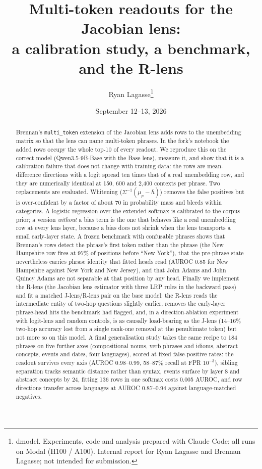 \documentclass[11pt]{article}
\title{Multi-token readouts for the Jacobian lens:\\ a calibration study, a benchmark, and the R-lens}
\author{Ryan Lagasse\thanks{dmodel. Experiments, code and analysis prepared with Claude Code; all runs on Modal (H100 / A100). Internal report for Ryan Lagasse and Brennan Lagasse; not intended for submission.}}
\date{September 12--13, 2026}
\renewcommand{\hbar}{\bar{h}}
\begin{document}
\maketitle

\begin{abstract}
Brennan's \texttt{multi\_token} extension of the Jacobian lens adds rows to the unembedding matrix so that the lens can name multi-token phrases. In the fork's notebook the added rows occupy the whole top-10 of every readout. We reproduce this on the correct model (Qwen3.5-9B-Base with the Base lens), measure it, and show that it is a calibration failure that does not change with training data: the rows are mean-difference directions with a logit spread ten times that of a real unembedding row, and they are numerically identical at 150, 600 and 2{,}400 contexts per phrase. Two replacements are evaluated. Whitening ($\Sigma^{-1}(\mu_p-\hbar)$) removes the false positives but is over-confident by a factor of about 70 in probability mass and bleeds within categories. A logistic regression over the extended softmax is calibrated to the corpus prior; a version \emph{without} a bias term is the one that behaves like a real unembedding row at every lens layer, because a bias does not shrink when the lens transports a small early-layer state. A frozen benchmark with confusable phrases shows that Brennan's rows detect the phrase's first token rather than the phrase (the New Hampshire row fires at 97\% of positions before ``New York''), that the pre-phrase state nevertheless carries phrase identity that fitted heads read (AUROC 0.85 for New Hampshire against New York and New Jersey), and that John Adams and John Quincy Adams are not separable at that position by any head. Finally we implement the R-lens (the Jacobian lens estimator with three LRP rules in the backward pass) and fit a matched J-lens/R-lens pair on the base model: the R-lens reads the intermediate entity of two-hop questions slightly earlier, removes the early-layer phrase-head hits the benchmark had flagged, and, in a direction-ablation experiment with logit-lens and random controls, is as causally load-bearing as the J-lens (14--16\% two-hop accuracy lost from a single rank-one removal at the penultimate token) but not more so on this model. A final generalisation study takes the same recipe to 184 phrases on five further axes (compositional nouns, verb phrases and idioms, abstract concepts, events and dates, four languages), scored at fixed false-positive rates: the readout survives every axis (AUROC 0.98--0.99, 58--87\% recall at FPR $10^{-3}$), sibling separation tracks semantic distance rather than syntax, events surface by layer 8 and abstract concepts by 24, fitting 136 rows in one softmax costs 0.005 AUROC, and row directions transfer across languages at AUROC 0.87--0.94 against language-matched negatives.
\end{abstract}
\end{document}
